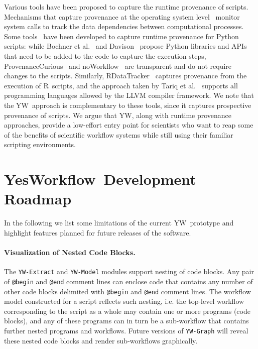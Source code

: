 \documentclass[15]{ijdc-v9}
\newcommand{\yw}{\textsf{YW}}
\newcommand{\YWT}{YesWorkflow}
\newcommand{\ywa}[1]{\texttt{\small #1}}
\newcommand{\ywm}[1]{\texttt{\small #1}}
\newcommand{\R}{R}
\begin{document}
Various tools have been proposed to capture the runtime provenance of
scripts. Mechanisms that capture provenance at the operating system
level~\cite{frew2008Automatic,guo2012BURRITO,muniswamy2006Provenance}
monitor system calls to track the data dependencies between
computational processes. Some
tools~\cite{bochner2008Python,davison2012Automated,huq2013ProvenanceCurious,murta2014noWorkflow}
have been developed to capture runtime provenance for Python scripts:
while Bochner et al.~\cite{bochner2008Python} and
Davison~\cite{davison2012Automated} propose Python libraries and APIs
that need to be added to the code to capture the execution steps,
ProvenanceCurious~\cite{huq2013ProvenanceCurious} and
noWorkflow~\cite{murta2014noWorkflow} are transparent and do not
require changes to the scripts. Similarly,
RDataTracker~\cite{Lerner2014RDataTracker} captures provenance from
the execution of \R\ scripts, and the approach taken by Tariq et
al.~\cite{Tariq2012Towards} supports all programming languages allowed
by the LLVM compiler framework. We note that the \yw\ approach is
complementary to these tools, since it captures prospective provenance
of scripts. We argue that \yw, along with runtime provenance
approaches, provide a low-effort entry point for scientists who want
to reap some of the benefits of scientific workflow systems while
still using their familiar scripting environments.


\section{\YWT\ Development Roadmap}\label{sec-conclusions}

In the following we list some limitations of the current \yw\
prototype and highlight features planned for future
releases of the software.

\paragraph{Visualization of Nested Code Blocks.}
The \ywm{YW-Extract} and \ywm{YW-Model} modules support
 nesting of code blocks. Any pair of \ywa{@begin} and \ywa{@end}
comment lines can enclose code that contains any number of other code
blocks delimited with \ywa{@begin} and \ywa{@end} comment lines.
The workflow model constructed for a script reflects such nesting, i.e.
the top-level workflow corresponding to the script as a whole may contain 
one or more programs (code blocks), and any of these programs can in turn be a 
sub-workflow that contains further nested programs and workflows.
Future versions of \ywm{YW-Graph} will reveal these nested code blocks 
and render sub-workflows graphically.
\end{document}
